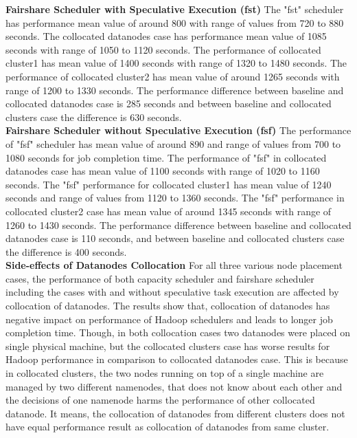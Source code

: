 \textbf{Fairshare Scheduler with Speculative Execution (fst)} The "fst" scheduler has performance mean value of around 800 with range of values from 720 to 880 seconds. The collocated datanodes case has performance mean value of 1085 seconds with range of 1050 to 1120 seconds. The performance of collocated cluster1 has mean value of 1400 seconds with range of 1320 to 1480 seconds. The performance of collocated cluster2 has mean value of around 1265 seconds with range of 1200 to 1330 seconds. The performance difference between baseline and collocated datanodes case is 285 seconds and between baseline and collocated clusters case the difference is 630 seconds.\\ 

\textbf{Fairshare Scheduler without Speculative Execution (fsf) } The performance of "fsf" scheduler  has mean value of around 890 and range of values from 700 to 1080 seconds for job completion time. The performance of "fsf" in collocated datanodes case has mean value of 1100 seconds with range of 1020 to 1160 seconds. The "fsf" performance for collocated cluster1 has mean value of 1240 seconds  and range of values from 1120 to 1360 seconds. The "fsf" performance in collocated cluster2 case has mean value of around 1345 seconds with range of 1260 to 1430 seconds. The performance difference between baseline and collocated datanodes  case is 110 seconds, and between baseline and collocated clusters case the difference is 400 seconds.\\
 

\textbf{Side-effects of Datanodes Collocation} For all three various node placement cases, the performance of both capacity scheduler and fairshare scheduler including the cases with and without speculative task execution are affected by collocation of datanodes. The results show that, collocation of datanodes has negative impact on performance of Hadoop schedulers and leads to longer job completion time. Though, in both collocation cases two datanodes were placed on single physical machine, but the collocated clusters case has worse results for Hadoop performance in comparison to collocated datanodes case. This is because in collocated clusters, the two nodes running on top of a single machine are managed by two different namenodes, that does not know about each other and the decisions of one namenode harms the performance of other collocated datanode. It means, the collocation of datanodes from different clusters does not have equal performance result as collocation of datanodes from same cluster. \\  




